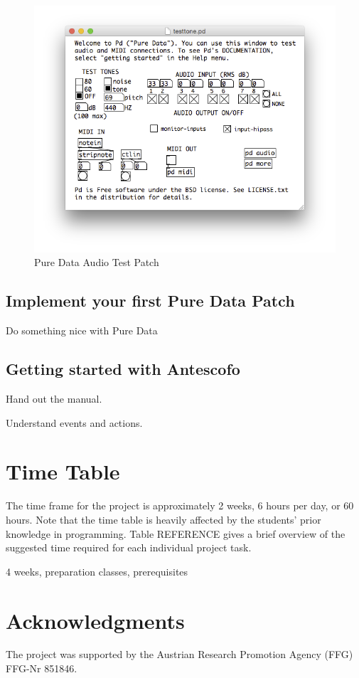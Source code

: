 \documentclass[onecolumn,nocopyrightspace,preprint]{sigplanconf}
\begin{document}
\begin{figure}[ht]
    \centering
    \includegraphics[scale=0.4]{fig/pd-test.png}
    \caption{Pure Data Audio Test Patch}
    \label{fig:pd-test}
\end{figure}



\subsection{Implement your first Pure Data Patch}

Do something nice with Pure Data


\subsection{Getting started with Antescofo}


Hand out the manual.

Understand events and actions.





\section{Time Table}

The time frame for the project is approximately 2 weeks, 6 hours per day, or
60 hours. Note that the time table is heavily affected by the students' prior
knowledge in programming. Table REFERENCE gives a brief overview of the
suggested time required for each individual project task.






4 weeks, preparation classes, prerequisites




\section{Acknowledgments}

The project was supported by the Austrian Research Promotion Agency (FFG) FFG-Nr 851846.


 
\end{document}
